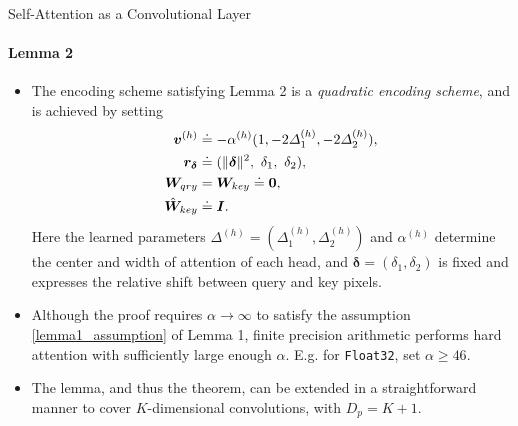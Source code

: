 \documentclass[9pt]{beamer}
\newcommand{\mb}{\bm}
\begin{document}
\begin{frame}{Self-Attention as a Convolutional Layer}
\framesubtitle{Lemma 2}
\begin{itemize}
\item The encoding scheme satisfying Lemma 2 is a {\em quadratic encoding scheme}, and is achieved by setting
\begin{align}
    \mb v\brac h &\doteq -\alpha\brac h 
        (1, -2\varDelta_1\brac h, -2\varDelta_2\brac h), \nonumber \\
    \mb r_{\bm \delta} &\doteq (\Vert\bm\delta\Vert^2,\ \delta_1,\ \delta_2), 
    \label{quad_encoding} \\
    \mb W_{qry} &= \mb W_{key} \doteq \bm 0, \nonumber \\
    \hat{\mb W}_{key} &\doteq \mb I. \nonumber
\end{align}
Here the learned parameters $\bm\varDelta^{(h)} = (\varDelta_1^{(h)}, \varDelta_2^{(h)})$ and $\alpha^{(h)}$ determine the center and width of attention of each head, and $\bm\delta = (\delta_1, \delta_2)$ is fixed and expresses the relative shift between query and key pixels.

\item Although the proof requires $\alpha\rightarrow\infty$ to satisfy the assumption \eqref{lemma1_assumption} of Lemma 1, finite precision arithmetic performs hard attention with sufficiently large enough $\alpha$. E.g. for \texttt{Float32}, set $\alpha\geq46$. 

\item The lemma, and thus the theorem, can be extended in a straightforward manner to cover $K$-dimensional convolutions, with $D_p=K+1$.
\end{itemize}
\end{frame}
\end{document}
